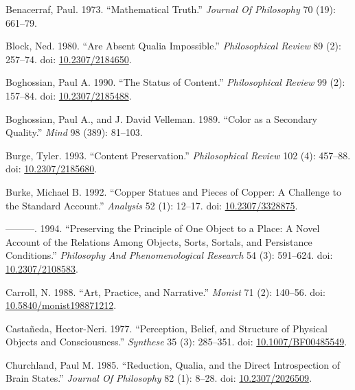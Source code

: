 \documentclass[
  10pt,
  letterpaper,
  DIV=11,
  numbers=noendperiod,
  twoside]{scrartcl}
\newlength{\cslhangindent}
\newenvironment{CSLReferences}[2] %
 {\begin{list}{}{%
  \setlength{\itemindent}{0pt}
  \setlength{\leftmargin}{0pt}
  \setlength{\parsep}{0pt}
  \ifodd #1
   \setlength{\leftmargin}{\cslhangindent}
   \setlength{\itemindent}{-1\cslhangindent}
  \fi
  \setlength{\itemsep}{#2\baselineskip}}}
 {\end{list}}
\begin{document}
\label{refs}
\begin{CSLReferences}{1}{0}
Benacerraf, Paul. 1973. {``Mathematical Truth.''} \emph{Journal Of
Philosophy} 70 (19): 661--79.

Block, Ned. 1980. {``Are Absent Qualia Impossible.''}
\emph{Philosophical Review} 89 (2): 257--74. doi:
\href{https://doi.org/10.2307/2184650}{10.2307/2184650}.

Boghossian, Paul A. 1990. {``The Status of Content.''}
\emph{Philosophical Review} 99 (2): 157--84. doi:
\href{https://doi.org/10.2307/2185488}{10.2307/2185488}.

Boghossian, Paul A., and J. David Velleman. 1989. {``Color as a
Secondary Quality.''} \emph{Mind} 98 (389): 81--103.

Burge, Tyler. 1993. {``Content Preservation.''} \emph{Philosophical
Review} 102 (4): 457--88. doi:
\href{https://doi.org/10.2307/2185680}{10.2307/2185680}.

Burke, Michael B. 1992. {``Copper Statues and Pieces of Copper: A
Challenge to the Standard Account.''} \emph{Analysis} 52 (1): 12--17.
doi: \href{https://doi.org/10.2307/3328875}{10.2307/3328875}.

---------. 1994. {``Preserving the Principle of One Object to a Place: A
Novel Account of the Relations Among Objects, Sorts, Sortals, and
Persistance Conditions.''} \emph{Philosophy And Phenomenological
Research} 54 (3): 591--624. doi:
\href{https://doi.org/10.2307/2108583}{10.2307/2108583}.

Carroll, N. 1988. {``Art, Practice, and Narrative.''} \emph{Monist} 71
(2): 140--56. doi:
\href{https://doi.org/10.5840/monist198871212}{10.5840/monist198871212}.

Castañeda, Hector-Neri. 1977. {``Perception, Belief, and Structure of
Physical Objects and Consciousness.''} \emph{Synthese} 35 (3): 285--351.
doi: \href{https://doi.org/10.1007/BF00485549}{10.1007/BF00485549}.

Churchland, Paul M. 1985. {``Reduction, Qualia, and the Direct
Introspection of Brain States.''} \emph{Journal Of Philosophy} 82 (1):
8--28. doi: \href{https://doi.org/10.2307/2026509}{10.2307/2026509}.


\end{CSLReferences}
\end{document}
